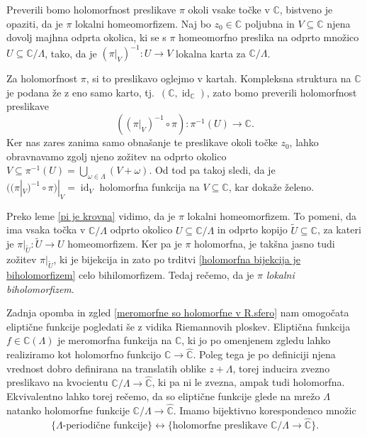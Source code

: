 \documentclass[mat1]{fmfdelo}
\numberwithin{equation}{section}
\newcommand{\C}{\mathbb C}
\newcommand{\RS}{\widehat{\C}}
\newcommand{\om}{\omega}
\newcommand{\inv}{^{-1}}
\newcommand{\torus}{\C/\Lambda}
\newcommand{\tj}{tj.\ }
\DeclareMathOperator{\id}{id}
\theoremstyle{definition}
\begin{document}
\begin{dokaz}
    Preverili bomo holomorfnost preslikave $\pi$ okoli vsake točke v $\C$, bistveno je opaziti, da je $\pi$ lokalni homeomorfizem. Naj bo $z_0 \in \C$ poljubna in $V \subseteq \C$ njena dovolj majhna odprta okolica, ki se s $\pi$ homeomorfno preslika na odprto množico $U \subseteq \torus$, tako, da je $(\pi|_{V})\inv : U \to V$ lokalna karta za $\torus$. 

    Za holomorfnost $\pi$, si to preslikavo oglejmo v kartah. Kompleksna struktura na $\C$ je podana že z eno samo karto, \tj $(\C, \id_\C)$, zato bomo preverili holomorfnost preslikave
    \[
        ((\pi|_{V})\inv \circ \pi) : \pi\inv(U) \to \C.
    \]
    Ker nas zares zanima samo obnašanje te preslikave okoli točke $z_0$, lahko obravnavamo zgolj njeno zožitev na odprto okolico $V \subseteq \pi\inv(U) = \bigcup_{\om \in \Lambda} (V + \om)$. Od tod pa takoj sledi, da je $((\pi|_V)\inv \circ \pi)|_V = \id_V$ holomorfna funkcija na $V \subseteq \C$, kar dokaže želeno. 
\end{dokaz}

\begin{opomba}
    Preko leme \ref{pi je krovna} vidimo, da je $\pi$ lokalni homeomorfizem. To pomeni, da ima vsaka točka v $\torus$ odprto okolico $U\subseteq \torus$ in odprto kopijo $\tilde{U} \subseteq \C$, za kateri je $\pi|_{\tilde{U}} : \tilde{U} \to U$ homeomorfizem. Ker pa je $\pi$ holomorfna, je takšna jasno tudi zožitev $\pi|_{\tilde{U}}$, ki je bijekcija in zato po trditvi \ref{holomorfna bijekcija je biholomorfizem} celo bihilomorfizem. Tedaj rečemo, da je $\pi$ \emph{lokalni biholomorfizem}.
\end{opomba}




Zadnja opomba in zgled \ref{meromorfne so holomorfne v R.sfero} nam omogočata eliptične funkcije pogledati še z vidika Riemannovih ploskev. Eliptična funkcija $f \in \C(\Lambda)$ je meromorfna funkcija na $\C$, ki jo po omenjenem zgledu lahko realiziramo kot holomorfno funkcijo $\C \to \RS$. Poleg tega je po definiciji njena vrednost dobro definirana na translatih oblike $z + \Lambda$, torej inducira zvezno preslikavo na kvocientu $\torus \to \RS$, ki pa ni le zvezna, ampak tudi holomorfna.  Ekvivalentno lahko torej rečemo, da so eliptične funkcije glede na mrežo $\Lambda$ natanko holomorfne funkcije $\torus \to \RS$. Imamo bijektivno korespondenco množic
\[
    \{\text{$\Lambda$-periodične funkcije}\} \longleftrightarrow \{\text{holomorfne preslikave } \torus \to \RS\}.
\]
\end{document}
